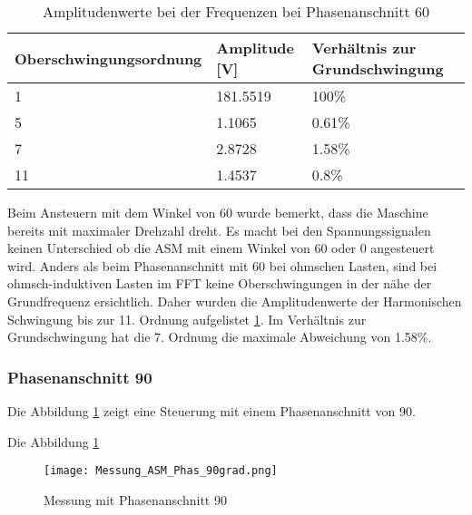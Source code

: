\begin{table}[ht!]
	\centering
	\begin{tabular}{|l|l|l|}
		\hline
		Oberschwingungsordnung & Amplitude {[}V{]} & Verhältnis zur Grundschwingung \\ \hline
		1                      & 181.5519          & 100\%                          \\ \hline
		5                      & 1.1065            & 0.61\%                         \\ \hline
		7                      & 2.8728            & 1.58\%                         \\ \hline
		11                     & 1.4537            & 0.8\%                          \\ \hline
	\end{tabular}
\caption{Amplitudenwerte bei der Frequenzen bei Phasenanschnitt 60\textdegree}\label{tab:Mess_Spannung_ASM_Phas60}
\end{table}

Beim Ansteuern mit dem Winkel von 60\textdegree \hspace{0.02cm} wurde bemerkt, dass die Maschine bereits mit maximaler Drehzahl dreht. Es macht bei den Spannungssignalen keinen Unterschied ob die ASM mit einem Winkel von 60\textdegree \hspace{0.02cm} oder 0\textdegree \hspace{0.02cm} angesteuert wird. Anders als beim Phasenanschnitt mit 60\textdegree\hspace{0.02cm} bei ohmschen Lasten, sind bei ohmsch-induktiven Lasten im FFT keine Oberschwingungen in der nähe der Grundfrequenz ersichtlich. Daher wurden die Amplitudenwerte der Harmonischen Schwingung bis zur 11. Ordnung aufgelistet \ref{tab:Mess_Spannung_ASM_Phas60}. Im Verhältnis zur Grundschwingung hat die 7. Ordnung die maximale Abweichung von 1.58\%.


\newpage
\subsubsection*{Phasenanschnitt 90\textdegree}
Die Abbildung \ref{fig:Mess_ASM_Phas90} zeigt eine Steuerung mit einem Phasenanschnitt von 90\textdegree.

Die Abbildung \ref{fig:Mess_ASM_Phas90}
\begin{figure}[ht!]
	\centering
	\texttt{[image: Messung\_ASM\_Phas\_90grad.png]}	
	\caption{Messung mit Phasenanschnitt 90\textdegree}\label{fig:Mess_ASM_Phas90}
\end{figure}
 

